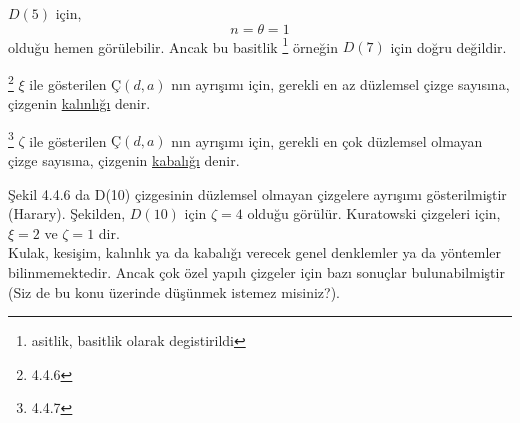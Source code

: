 \documentclass[11pt]{amsbook}
\begin{document}



$D(5)$ için,
                $$ n = \theta = 1$$
olduğu hemen görülebilir. Ancak bu basitlik \footnote{asitlik, basitlik olarak degistirildi} örneğin $D(7)$ için doğru değildir.
\begin{definition}\footnote{4.4.6}
    $\xi$ ile gösterilen $Ç(d,a)$ nın ayrışımı için, gerekli en az düzlemsel çizge sayısına, çizgenin \underline{kalınlığı} denir.
\end{definition}

\begin{definition}\footnote{4.4.7}
    $\zeta$ ile gösterilen $Ç(d,a)$ nın ayrışımı için, gerekli en çok düzlemsel olmayan çizge sayısına, çizgenin \underline{kabalığı} denir.
\end{definition}
Şekil 4.4.6 da D(10) çizgesinin düzlemsel olmayan çizgelere ayrışımı gösterilmiştir (Harary). Şekilden, $D(10)$ için $\zeta = 4$ olduğu görülür. Kuratowski çizgeleri için, $\xi = 2$ ve $\zeta = 1$ dir.\\

Kulak, kesişim, kalınlık ya da kabalığı verecek genel denklemler ya da yöntemler bilinmemektedir. Ancak çok özel yapılı çizgeler için bazı sonuçlar bulunabilmiştir (Siz de bu konu üzerinde düşünmek istemez misiniz?).
        
    
        
        
        
        
        
        
        
        
\end{document}
